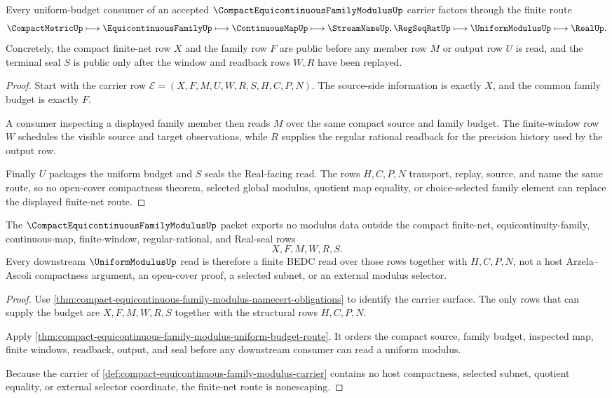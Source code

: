 \begin{theorem}
\label{thm:compact-equicontinuous-family-modulus-uniform-budget-route}
Every uniform-budget consumer of an accepted $\CompactEquicontinuousFamilyModulusUp$ carrier factors through the finite route
$$
\CompactMetricUp \longmapsto \EquicontinuousFamilyUp \longmapsto \ContinuousMapUp \longmapsto \StreamNameUp,\RegSeqRatUp \longmapsto \UniformModulusUp \longmapsto \RealUp .
$$
Concretely, the compact finite-net row $X$ and the family row $F$ are public before any member row $M$ or output row $U$ is read, and the terminal seal $S$ is public only after the window and readback rows $W,R$ have been replayed.
\end{theorem}
\begin{proof}
Start with the carrier row $\mathcal{E}=(X,F,M,U,W,R,S,H,C,P,N)$. The source-side information is exactly $X$, and the common family budget is exactly $F$.

A consumer inspecting a displayed family member then reads $M$ over the same compact source and family budget. The finite-window row $W$ schedules the visible source and target observations, while $R$ supplies the regular rational readback for the precision history used by the output row.

Finally $U$ packages the uniform budget and $S$ seals the Real-facing read. The rows $H,C,P,N$ transport, replay, source, and name the same route, so no open-cover compactness theorem, selected global modulus, quotient map equality, or choice-selected family element can replace the displayed finite-net route.
\end{proof}

\begin{theorem}
\label{thm:compact-equicontinuous-family-modulus-finite-net-nonescape}
The $\CompactEquicontinuousFamilyModulusUp$ packet exports no modulus data outside the compact finite-net, equicontinuity-family, continuous-map, finite-window, regular-rational, and Real-seal rows
$$
X,F,M,W,R,S .
$$
Every downstream $\UniformModulusUp$ read is therefore a finite BEDC read over those rows together with $H,C,P,N$, not a host Arzela--Ascoli compactness argument, an open-cover proof, a selected subnet, or an external modulus selector.
\end{theorem}
\begin{proof}
Use \autoref{thm:compact-equicontinuous-family-modulus-namecert-obligations} to identify the carrier surface. The only rows that can supply the budget are $X,F,M,W,R,S$ together with the structural rows $H,C,P,N$.

Apply \autoref{thm:compact-equicontinuous-family-modulus-uniform-budget-route}. It orders the compact source, family budget, inspected map, finite windows, readback, output, and seal before any downstream consumer can read a uniform modulus.

Because the carrier of \autoref{def:compact-equicontinuous-family-modulus-carrier} contains no host compactness, selected subnet, quotient equality, or external selector coordinate, the finite-net route is nonescaping.
\end{proof}

